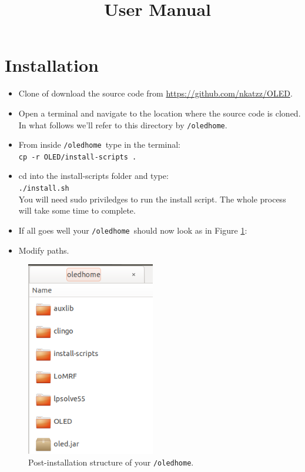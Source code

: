 \documentclass[12pt]{article}
\title{\oled \  User Manual}
\newcommand{\home}{\texttt{/oledhome}}
\begin{document}
\maketitle

\section{Installation}

\begin{itemize}
\item Clone of download the source code from \url{https://github.com/nkatzz/OLED}. 
\item Open a terminal and navigate to the location where the source code is cloned. In what follows we'll refer to this directory by \home.
\item From inside \home \ type in the terminal: \\ \texttt{cp -r OLED/install-scripts .}
\item cd into the install-scripts folder and type:\\
\texttt{./install.sh}\\
You will need sudo priviledges to run the install script. The whole process will take some time to complete.
\item If all goes well your \home \ should now look as in Figure \ref{fig:install}:

\item Modify paths.

\end{itemize}




 

\begin{figure}[h]
\centering
\includegraphics[width=0.5\textwidth]{./figures/oledhome-2}
\caption{Post-installation structure of your \home.}%
\label{fig:install}
\end{figure}
\end{document}
